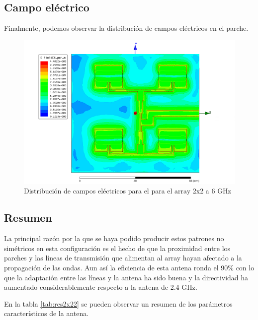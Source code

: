 \subsection{Campo eléctrico}
\par Finalmente, podemos observar la distribución de campos eléctricos en el parche. 

\begin{figure}[H]
    \centering
        \includegraphics[width=\textwidth]{archivos/analisis/2x22/8}
        \caption{Distribución de campos eléctricos para el para el array 2x2 a 6 GHz}
        \label{fig:elec2x22}
\end{figure}

\subsection{Resumen}
\par La principal razón por la que se haya podido producir estos patrones no simétricos en esta configuración es el hecho de que la proximidad entre los parches y las líneas de transmisión que alimentan al array hayan afectado a la propagación de las ondas. Aun así la eficiencia de esta antena ronda el 90\% con lo que la adaptación entre las líneas y la antena ha sido buena y la directividad ha aumentado considerablemente respecto a la antena de 2.4 GHz.
\\
\par En la tabla \ref{tab:res2x22} se pueden observar un resumen de los parámetros característicos de la antena.

